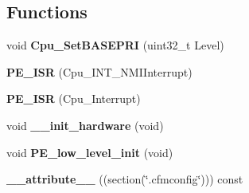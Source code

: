 \subsection*{Functions}
\begin{DoxyCompactItemize}
\item 
\hypertarget{group___cpu__module_ga0ee0366b566c5a7b6088ef899c4d19a7}{}void {\bfseries Cpu\+\_\+\+Set\+B\+A\+S\+E\+P\+R\+I} (uint32\+\_\+t Level)\label{group___cpu__module_ga0ee0366b566c5a7b6088ef899c4d19a7}

\item 
\hypertarget{group___cpu__module_ga89f6e345028fe4a0a105f4f95e1bb85c}{}{\bfseries P\+E\+\_\+\+I\+S\+R} (Cpu\+\_\+\+I\+N\+T\+\_\+\+N\+M\+I\+Interrupt)\label{group___cpu__module_ga89f6e345028fe4a0a105f4f95e1bb85c}

\item 
\hypertarget{group___cpu__module_gafa0067fa0d355a26ca9894983c01be6f}{}{\bfseries P\+E\+\_\+\+I\+S\+R} (Cpu\+\_\+\+Interrupt)\label{group___cpu__module_gafa0067fa0d355a26ca9894983c01be6f}

\item 
\hypertarget{group___cpu__module_ga32a8d86789a3326b3120bf1e1c1d4252}{}void {\bfseries \+\_\+\+\_\+init\+\_\+hardware} (void)\label{group___cpu__module_ga32a8d86789a3326b3120bf1e1c1d4252}

\item 
\hypertarget{group___cpu__module_ga95039f54c45f24c1b4ed640fa2f63f11}{}void {\bfseries P\+E\+\_\+low\+\_\+level\+\_\+init} (void)\label{group___cpu__module_ga95039f54c45f24c1b4ed640fa2f63f11}

\item 
\hypertarget{group___cpu__module_ga2d9b5b981f451cdf47bf43b4f9cc9e03}{}{\bfseries \+\_\+\+\_\+attribute\+\_\+\+\_\+} ((section(\char`\"{}.cfmconfig\char`\"{}))) const\label{group___cpu__module_ga2d9b5b981f451cdf47bf43b4f9cc9e03}

\end{DoxyCompactItemize}
